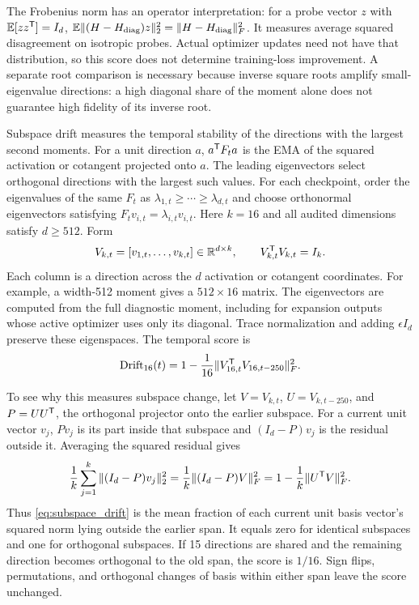 The Frobenius norm has an operator interpretation: for a probe vector $z$ with $\mathbb{E}[zz^{{\mathsf{T}}}]=I_d$, $\mathbb{E}\|(H-H_{\rm diag})z\|_2^2=\|H-H_{\rm diag}\|_F^2$. It measures average squared disagreement on isotropic probes. Actual optimizer updates need not have that distribution, so this score does not determine training-loss improvement. A separate root comparison is necessary because inverse square roots amplify small-eigenvalue directions: a high diagonal share of the moment alone does not guarantee high fidelity of its inverse root.

Subspace drift measures the temporal stability of the directions with the largest second moments. For a unit direction $a$, $a^{{\mathsf{T}}}F_ta$ is the EMA of the squared activation or cotangent projected onto $a$. The leading eigenvectors select orthogonal directions with the largest such values. For each checkpoint, order the eigenvalues of the same $F_t$ as $\lambda_{1,t}\ge\cdots\ge\lambda_{d,t}$ and choose orthonormal eigenvectors satisfying $F_tv_{i,t}=\lambda_{i,t}v_{i,t}$. Here $k=16$ and all audited dimensions satisfy $d\ge512$. Form
\[
 V_{k,t}=[v_{1,t},\ldots,v_{k,t}]\in\mathbb{R}^{d\times k},\qquad
 V_{k,t}^{{\mathsf{T}}}V_{k,t}=I_k.
\]
Each column is a direction across the $d$ activation or cotangent coordinates. For example, a width-512 moment gives a $512\times16$ matrix. The eigenvectors are computed from the full diagnostic moment, including for expansion outputs whose active optimizer uses only its diagonal. Trace normalization and adding $\epsilon I_d$ preserve these eigenspaces. The temporal score is
\begin{equation}
 \mathrm{Drift}_{16}(t)=1-\frac1{16}\|V_{16,t}^{{\mathsf{T}}}V_{16,t-250}\|_F^2.
 \label{eq:subspace_drift}
\end{equation}

To see why this measures subspace change, let $V=V_{k,t}$, $U=V_{k,t-250}$, and $P=UU^{{\mathsf{T}}}$, the orthogonal projector onto the earlier subspace. For a current unit vector $v_j$, $Pv_j$ is its part inside that subspace and $(I_d-P)v_j$ is the residual outside it. Averaging the squared residual gives
\[
 \frac1k\sum_{j=1}^k\|(I_d-P)v_j\|_2^2
 =\frac1k\|(I_d-P)V\|_F^2
 =1-\frac1k\|U^{{\mathsf{T}}}V\|_F^2.
\]
Thus \cref{eq:subspace_drift} is the mean fraction of each current unit basis vector's squared norm lying outside the earlier span. It equals zero for identical subspaces and one for orthogonal subspaces. If 15 directions are shared and the remaining direction becomes orthogonal to the old span, the score is $1/16$. Sign flips, permutations, and orthogonal changes of basis within either span leave the score unchanged.

